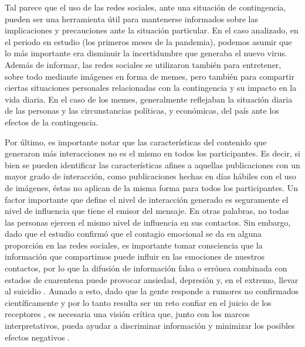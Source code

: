 \documentclass[spanish]{textolivre}
\begin{document}
Tal parece que el uso de las redes sociales, ante una situación de contingencia, pueden ser una herramienta útil para mantenerse informados sobre las implicaciones y precauciones ante la situación particular. En el caso analizado, en el periodo en estudio (los primeros meses de la pandemia), podemos asumir que lo más importante era disminuir la incertidumbre que generaba el nuevo virus. Además de informar, las redes sociales se utilizaron también para entretener, sobre todo mediante imágenes en forma de memes, pero también para compartir ciertas situaciones personales relacionadas con la contingencia y su impacto en la vida diaria. En el caso de los memes, generalmente reflejaban la situación diaria de las personas y las circunstancias políticas, y económicas, del país ante los efectos de la contingencia. 

Por último, es importante notar que las características del contenido que generaron más interacciones no es el mismo en todos los participantes. Es decir, si bien se pueden identificar las características afines a aquellas publicaciones con un mayor grado de interacción, como publicaciones hechas en días hábiles con el uso de imágenes, éstas no aplican de la misma forma para todos los participantes. Un factor importante que define el nivel de interacción generado es seguramente el nivel de influencia que tiene el emisor del mensaje. En otras palabras, no todas las personas ejercen el mismo nivel de influencia en sus contactos. Sin embargo, dado que el estudio confirmó que el contagio emocional se da en alguna proporción en las redes sociales, es importante tomar consciencia que la información que compartimos puede influir en las emociones de nuestros contactos, por lo que la difusión de información falsa o errónea combinada con estados de cuarentena puede provocar ansiedad, depresión y, en el extremo, llevar al suicidio \cite{gonzlezPadilla2020}. Aunado a esto, dado que la gente responde a rumores no confirmados científicamente y por lo tanto resulta ser un reto confiar en el juicio de los receptores \cite{cato2021,wheaton2021,prikhidko2020}, es necesaria una visión crítica que, junto con los marcos interpretativos, pueda ayudar a discriminar información y minimizar los posibles efectos negativos \cite{salazar2018}. 
\end{document}
